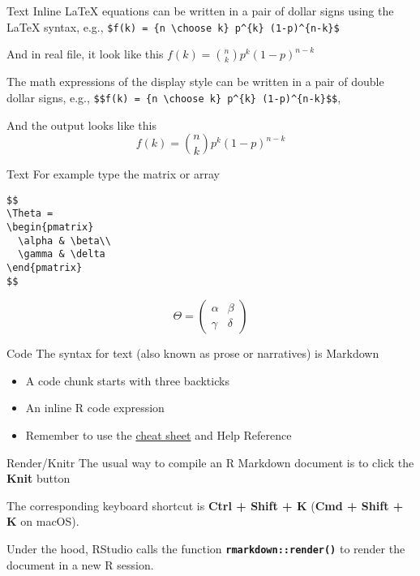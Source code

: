 \documentclass[
  ignorenonframetext,
]{beamer}
\begin{document}
\begin{frame}[fragile]{Text}
\label{text}
Inline LaTeX equations can be written in a pair of dollar signs using
the LaTeX syntax, e.g.,
\texttt{\$f(k)\ =\ \{n\ \textbackslash{}choose\ k\}\ p\^{}\{k\}\ (1-p)\^{}\{n-k\}\$}

And in real file, it look like this
\(f(k) = {n \choose k} p^{k} (1-p)^{n-k}\)

The math expressions of the display style can be written in a pair of
double dollar signs, e.g.,
\texttt{\$\$f(k)\ =\ \{n\ \textbackslash{}choose\ k\}\ p\^{}\{k\}\ (1-p)\^{}\{n-k\}\$\$},

And the output looks like this
\[f(k) = {n \choose k} p^{k} (1-p)^{n-k}\]
\end{frame}

\begin{frame}[fragile]{Text}
\label{text-1}
For example type the matrix or array

\begin{verbatim}
$$
\Theta = 
\begin{pmatrix}
  \alpha & \beta\\
  \gamma & \delta
\end{pmatrix}
$$
\end{verbatim}

\[\Theta = \begin{pmatrix}\alpha & \beta\\
\gamma & \delta
\end{pmatrix}\]
\end{frame}

\begin{frame}{Code}
\label{code}
The syntax for text (also known as prose or narratives) is Markdown

\begin{itemize}
\item
  A code chunk starts with three backticks
\item
  An inline R code expression
\item
  Remember to use the
  \href{https://www.rstudio.com/resources/cheatsheets/}{cheat sheet} and
  Help Reference
\end{itemize}
\end{frame}

\begin{frame}[fragile]{Render/Knitr}
\label{renderknitr}
The usual way to compile an R Markdown document is to click the
\textbf{Knit} button

The corresponding keyboard shortcut is \textbf{Ctrl + Shift + K}
(\textbf{Cmd + Shift + K} on macOS).

Under the hood, RStudio calls the function
\textbf{\texttt{rmarkdown::render()}} to render the document in a new R
session.
\end{frame}
\end{document}
